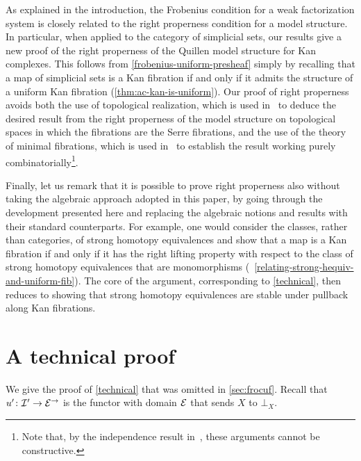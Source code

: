 \documentclass[reqno,10pt,a4paper,oneside,draft]{amsart}
\begin{document}
\begin{remark}
As explained in the introduction, the Frobenius condition for a weak factorization system is closely related to the right properness condition for a model structure. In particular, when applied to the category of simplicial sets, our results give a new
proof of the right properness of the Quillen model structure for Kan complexes. This follows from
\cref{frobenius-uniform-presheaf}
simply by recalling that a map of simplicial sets is a Kan fibration if and only if it admits
the structure of a uniform Kan fibration (\cref{thm:ac-kan-is-uniform}). 
Our proof of right properness avoids both the use of topological realization, which is used 
in~\cite[Theorem~13.1.13]{hirschhorn-model-localizations} to deduce
the desired result from the right properness of the model structure on topological spaces in which the fibrations are the Serre fibrations, and the use of the theory of minimal fibrations,
which is used in~\cite[Theorem~1.7.1]{joyal-tierney-notes} to establish the result 
working purely combinatorially\footnote{Note that, by the independence result in~\cite{coquand-non-constructivity-kan}, these arguments cannot be constructive.}.

Finally, let us remark that it is possible to prove right properness also without taking the algebraic approach adopted in 
this paper, by going through the development presented here and replacing the algebraic notions and results with their
standard counterparts. For example, one would consider the classes, rather than categories, of strong homotopy equivalences 
and show that a map is a Kan fibration if and only if it has the right lifting property with respect to the class of strong homotopy
equivalences that are monomorphisms (\cf~\cref{relating-strong-hequiv-and-uniform-fib}).
The core of the argument, corresponding to \cref{technical}, then reduces to showing that strong homotopy equivalences are stable under pullback along Kan fibrations.
\end{remark}


\appendix

\section{A technical proof}
\label{app:tecp}

We give the proof of \cref{technical} that was omitted in \cref{sec:frocuf}.
Recall that $u' \co \cal{I}' \to \cal{E}^\to$ is the functor with domain $\cal{E}$ that sends $X$ to $\bot_X$.
\end{document}
